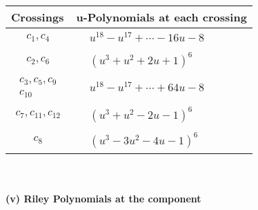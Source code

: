 \documentclass[1p]{elsarticle_modified}
\theoremstyle{definition}
\begin{document}
\begin{tabular}{m{50pt}|m{274pt}}
Crossings & \hspace{64pt}u-Polynomials at each crossing \\
\hline $$\begin{aligned}c_{1},c_{4}\end{aligned}$$&$\begin{aligned}
&u^{18}- u^{17}+\cdots-16 u-8
\end{aligned}$\\
\hline $$\begin{aligned}c_{2},c_{6}\end{aligned}$$&$\begin{aligned}
&(u^3+u^2+2 u+1)^6
\end{aligned}$\\
\hline $$\begin{aligned}c_{3},c_{5},c_{9}\\c_{10}\end{aligned}$$&$\begin{aligned}
&u^{18}- u^{17}+\cdots+64 u-8
\end{aligned}$\\
\hline $$\begin{aligned}c_{7},c_{11},c_{12}\end{aligned}$$&$\begin{aligned}
&(u^3+u^2-2 u-1)^6
\end{aligned}$\\
\hline $$\begin{aligned}c_{8}\end{aligned}$$&$\begin{aligned}
&(u^3-3 u^2-4 u-1)^6
\end{aligned}$\\
\hline
\end{tabular}\\~\\
\newpage\renewcommand{\arraystretch}{1}
\flushleft \textbf{(v) Riley Polynomials at the component}\newline \\
\end{document}
